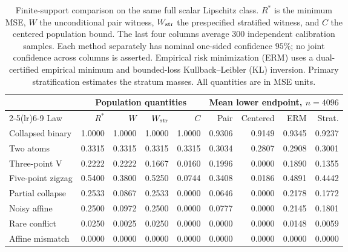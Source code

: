 \begin{table}[t]
\centering\small
\setlength{\tabcolsep}{3pt}
\begin{tabular}{lrrrrrrrr}
\toprule
& \multicolumn{4}{c}{Population quantities} & \multicolumn{4}{c}{Mean lower endpoint, $n=4096$} \\
\cmidrule(lr){2-5}\cmidrule(lr){6-9}
Law & $R^*$ & $W$ & $W_{\rm str}$ & $C$ & Pair & Centered & ERM & Strat. \\
\midrule
Collapsed binary & 1.0000 & 1.0000 & 1.0000 & 1.0000 & 0.9306 & 0.9149 & 0.9345 & 0.9237 \\
Two atoms & 0.3315 & 0.3315 & 0.3315 & 0.3315 & 0.3034 & 0.2807 & 0.2908 & 0.3001 \\
Three-point V & 0.2222 & 0.2222 & 0.1667 & 0.0160 & 0.1996 & 0.0000 & 0.1890 & 0.1355 \\
Five-point zigzag & 0.5400 & 0.3800 & 0.5250 & 0.0744 & 0.3408 & 0.0186 & 0.4891 & 0.4442 \\
Partial collapse & 0.2533 & 0.0867 & 0.2533 & 0.0000 & 0.0646 & 0.0000 & 0.2178 & 0.1772 \\
Noisy affine & 0.2500 & 0.0972 & 0.2500 & 0.0000 & 0.0777 & 0.0000 & 0.2145 & 0.1801 \\
Rare conflict & 0.0250 & 0.0025 & 0.0250 & 0.0000 & 0.0000 & 0.0000 & 0.0148 & 0.0059 \\
Affine mismatch & 0.0000 & 0.0000 & 0.0000 & 0.0000 & 0.0000 & 0.0000 & 0.0000 & 0.0000 \\
\bottomrule
\end{tabular}
\caption{Finite-support comparison on the same full scalar Lipschitz class. $R^*$ is the minimum MSE, $W$ the unconditional pair witness, $W_{\rm str}$ the prespecified stratified witness, and $C$ the centered population bound. The last four columns average 300 independent calibration samples. Each method separately has nominal one-sided confidence $95\%$; no joint confidence across columns is asserted. Empirical risk minimization (ERM) uses a dual-certified empirical minimum and bounded-loss Kullback--Leibler (KL) inversion. Primary stratification estimates the stratum masses. All quantities are in MSE units.}
\label{tab:witness-comparison}
\end{table}
